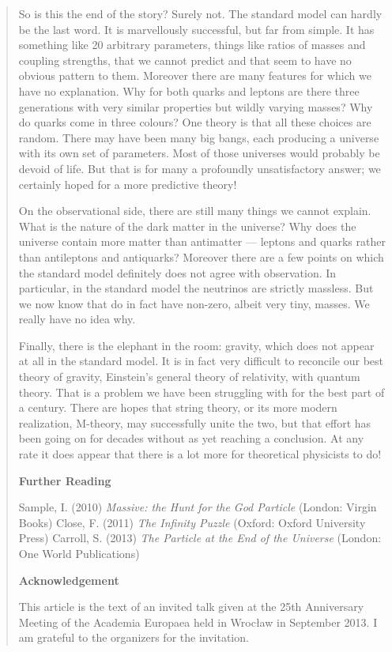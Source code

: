 \begin{quote}
So is this the end of the story? Surely not. The standard model can hardly be the last word. It is marvellously successful, but far from simple. It has something like 20 arbitrary parameters, things like ratios of masses and coupling strengths, that we cannot predict and that seem to have no obvious pattern to them. Moreover there are many features for which we have no explanation. Why for both quarks and leptons are there three generations with very similar properties but wildly varying masses? Why do quarks come in three colours? One theory is that all these choices are random. There may have been many big bangs, each producing a universe with its own set of parameters. Most of those universes would probably be devoid of life. But that is for many a profoundly unsatisfactory answer; we certainly hoped for a more predictive theory!

On the observational side, there are still many things we cannot explain. What is the nature of the dark matter in the universe? Why does the universe contain more matter than antimatter — leptons and quarks rather than antileptons and antiquarks? Moreover there are a few points on which the standard model definitely does not agree with observation. In particular, in the standard model the neutrinos are strictly massless. But we now know that do in fact have non-zero, albeit very tiny, masses. We really have no idea why.

Finally, there is the elephant in the room: gravity, which does not appear at all in the standard model. It is in fact very difficult to reconcile our best theory of gravity, Einstein’s general theory of relativity, with quantum theory. That is a problem we have been struggling with for the best part of a century. There are hopes that string theory, or its more modern realization, M-theory, may successfully unite the two, but that effort has been going on for decades without as yet reaching a conclusion. At any rate it does appear that there is a lot more for theoretical physicists to do!

\textbf{Further Reading}

Sample, I. (2010) \emph{Massive: the Hunt for the God Particle} (London: Virgin Books)
Close, F. (2011) \emph{The Infinity Puzzle} (Oxford: Oxford University Press)
Carroll, S. (2013) \emph{The Particle at the End of the Universe} (London: One World Publications)

\textbf{Acknowledgement}

This article is the text of an invited talk given at the 25th Anniversary Meeting of the Academia Europaea held in Wrocław in September 2013. I am grateful to the organizers for the invitation.
\end{quote}
